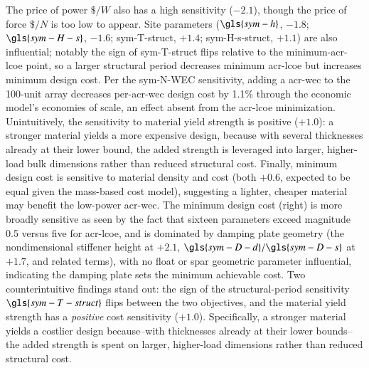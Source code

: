     The price of power $\$/W$ also has a high sensitivity ($-2.1$), though the price of force $\$/N$ is too low to appear.
    Site parameters ($\gls{sym-h}$, $-1.8$; $\gls{sym-H-s}$, $-1.6$; \gls{sym-T-struct}, $+1.4$; \gls{sym-H-s-struct}, $+1.1$) are also influential;
    notably the sign of \gls{sym-T-struct} flips relative to the minimum-\gls{acr-lcoe} point, so a larger structural period decreases minimum \gls{acr-lcoe} but increases minimum design cost.
    Per the \gls{sym-N-WEC} sensitivity, adding a \gls{acr-wec} to the 100-unit array decreases per-\gls{acr-wec} design cost by 1.1\% through the economic model's economies of scale, an effect absent from the \gls{acr-lcoe} minimization.
    Unintuitively, the sensitivity to material yield strength is positive ($+1.0$):
    a stronger material yields a more expensive design, because with several thicknesses already at their lower bound,
    the added strength is leveraged into larger, higher-load bulk dimensions rather than reduced structural cost.
    Finally, minimum design cost is sensitive to material density and cost (both $+0.6$, expected to be equal given the mass-based cost model),
    suggesting a lighter, cheaper material may benefit the low-power \gls{acr-wec}.
\else
    The minimum design cost (right) is more broadly sensitive as seen by the fact that 
    sixteen parameters exceed magnitude 0.5 versus five for \gls{acr-lcoe},
    and is dominated by damping plate geometry (the nondimensional stiffener height at $+2.1$, $\gls{sym-D-d}/\gls{sym-D-s}$ at $+1.7$, and related terms),
    with no float or spar geometric parameter influential, indicating the damping plate sets the minimum achievable cost.
    Two counterintuitive findings stand out: the sign of the structural-period sensitivity $\gls{sym-T-struct}$ flips between the two objectives,
    and the material yield strength has a \emph{positive} cost sensitivity ($+1.0$).
    Specifically, a stronger material yields a costlier design
    because--with thicknesses already at their lower bounds--the added strength is spent on larger, higher-load dimensions rather than reduced structural cost.
\fi


